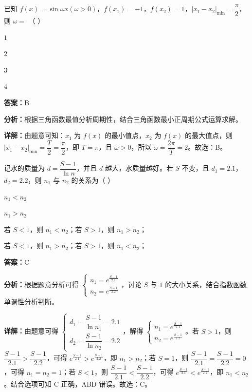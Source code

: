 \begin{question}[points=4]
已知 $f(x)=\sin\omega x(\omega>0)$，$f(x_1)=-1$，$f(x_2)=1$，$|x_1-x_2|_{\min}=\dfrac{\pi}{2}$，则 $\omega=$ （ ）
\begin{choices}
  \item $1$
  \item $2$
  \item $3$
  \item $4$
\end{choices}
\begin{solution}
\textbf{答案：}B

\textbf{分析：}根据三角函数最值分析周期性，结合三角函数最小正周期公式运算求解。

\textbf{详解：}由题意可知：$x_1$ 为 $f(x)$ 的最小值点，$x_2$ 为 $f(x)$ 的最大值点，则 $|x_1-x_2|_{\min}=\dfrac{T}{2}=\dfrac{\pi}{2}$，即 $T=\pi$，且 $\omega>0$，所以 $\omega=\dfrac{2\pi}{T}=2$。故选：B。
\end{solution}
\end{question}

\begin{question}[points=4]
记水的质量为 $d=\dfrac{S-1}{\ln n}$，并且 $d$ 越大，水质量越好。若 $S$ 不变，且 $d_1=2.1$，$d_2=2.2$，则 $n_1$ 与 $n_2$ 的关系为（ ）
\begin{choices}
  \item $n_1 < n_2$
  \item $n_1 > n_2$
  \item 若 $S<1$，则 $n_1<n_2$；若 $S>1$，则 $n_1>n_2$；
  \item 若 $S<1$，则 $n_1>n_2$；若 $S>1$，则 $n_1<n_2$；
\end{choices}
\begin{solution}
\textbf{答案：}C

\textbf{分析：}根据题意分析可得 $\begin{cases} n_1 = e^{\frac{S-1}{2.1}} \\ n_2 = e^{\frac{S-1}{2.2}} \end{cases}$，讨论 $S$ 与 $1$ 的大小关系，结合指数函数单调性分析判断。

\textbf{详解：}由题意可得 $\begin{cases} d_1 = \dfrac{S-1}{\ln n_1}=2.1 \\ d_2 = \dfrac{S-1}{\ln n_2}=2.2 \end{cases}$，解得 $\begin{cases} n_1 = e^{\frac{S-1}{2.1}} \\ n_2 = e^{\frac{S-1}{2.2}} \end{cases}$。若 $S>1$，则 $\dfrac{S-1}{2.1} > \dfrac{S-1}{2.2}$，可得 $e^{\frac{S-1}{2.1}} > e^{\frac{S-1}{2.2}}$，即 $n_1>n_2$；若 $S=1$，则 $\dfrac{S-1}{2.1} = \dfrac{S-1}{2.2} =0$，可得 $n_1=n_2=1$；若 $S<1$，则 $\dfrac{S-1}{2.1} < \dfrac{S-1}{2.2}$，可得 $e^{\frac{S-1}{2.1}} < e^{\frac{S-1}{2.2}}$，即 $n_1<n_2$。结合选项可知 C 正确，ABD 错误。故选：C。
\end{solution}
\end{question}

